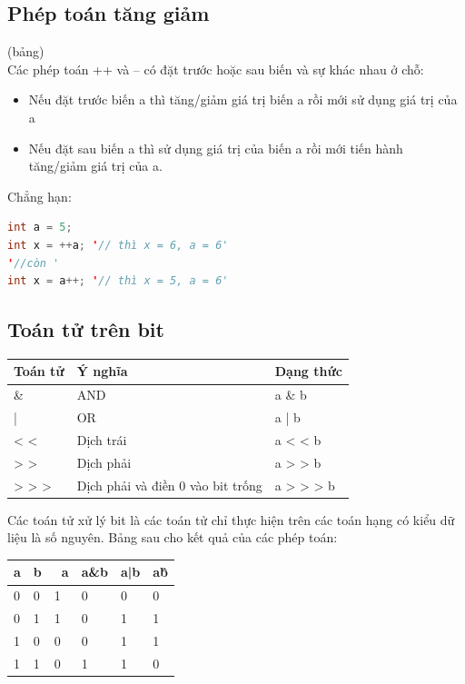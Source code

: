 \subsection{Phép toán tăng giảm}
(bảng)\\
\indent Các phép toán ++ và – có đặt trước hoặc sau biến và sự khác nhau ở chỗ:
\begin{itemize}
\item Nếu đặt trước biến a thì tăng/giảm giá trị biến a rồi mới sử dụng giá trị của a
\item Nếu đặt sau biến a thì sử dụng giá trị của biến a rồi mới tiến hành tăng/giảm giá trị của a.
\end{itemize}
\indent Chẳng hạn:\\
\begin{lstlisting}[escapechar=',language=java]	
int a = 5;
int x = ++a; '// thì x = 6, a = 6'
'//còn '
int x = a++; '// thì x = 5, a = 6'
\end{lstlisting}

\subsection{Toán tử trên bit}
\begin{center}
\centering
\begin{tabular}{ lll}
\hline
Toán tử&Ý nghĩa&Dạng thức\\
\hline
\& &AND&a \& b\\
\hline
| &OR&a | b\\
\hline
< < &Dịch trái&a < < b\\
\hline
> > &Dịch phải&a > > b\\
\hline
> > > &Dịch phải và điền 0 vào bit trống&a > > > b\\
\hline
\end{tabular}
\end{center}
\indent Các toán tử xử lý bit là các toán tử chỉ thực hiện trên các toán hạng có kiểu dữ liệu là số nguyên. Bảng sau cho kết quả của các phép toán:\\
\begin{center}
\begin{tabular}{ llllll}
\hline
a&b&~a&a\&b&a|b&a\^b\\
\hline
0&0&1&0&0&0\\
\hline
0&1&1&0&1&1\\
\hline
1&0&0&0&1&1\\
\hline
1&1&0&1&1&0\\
\hline
\end{tabular}
\end{center}
